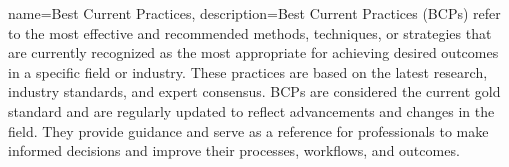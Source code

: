 \usepackage[toc]{glossaries}
\makeglossaries


{
    name={Best Current Practices},
    description={Best Current Practices (BCPs) refer to the most effective and recommended methods, techniques, or strategies that are currently recognized as the most appropriate for achieving desired outcomes in a specific field or industry. These practices are based on the latest research, industry standards, and expert consensus. BCPs are considered the current gold standard and are regularly updated to reflect advancements and changes in the field. They provide guidance and serve as a reference for professionals to make informed decisions and improve their processes, workflows, and outcomes.}
}
